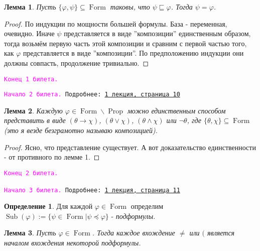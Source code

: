 \documentclass[a4paper,100pt]{article}
\theoremstyle{indented}
\newtheorem{lemma}{Лемма}
\theoremstyle{definition}
\newtheorem{defn}{Определение}
\theoremstyle{remark}
\DeclareMathOperator{\Prop}{Prop}
\DeclareMathOperator{\form}{Form}
\DeclareMathOperator{\Sub}{Sub}
\begin{document}
\begin{lemma}
  Пусть $\{\varphi , \psi\}\subseteq \form$ таковы, что $\psi \sqsubseteq \varphi$. Тогда $\psi = \varphi$. 
\end{lemma}

\begin{proof}
  По индукции по мощности большей формулы. База - переменная, очевидно. Иначе $\psi$ представляется в виде ''композиции'' единственным образом, тогда возьмём первую часть этой композиции и сравним с первой частью того, как $\varphi$ представляется в виде ''композиции''. По предположению индукции они должны совпасть, продолжение тривиально.
\end{proof}

\texttt{\textcolor{magenta}{Конец 1 билета.}} 

\hrulefill

\texttt{\hypertarget{b2}{\textcolor{magenta}{Начало 2 билета.}} Подробнее: \href{http://www.mi-ras.ru/~speranski/courses/logic-1-2021-spring/slides_1.pdf}{1 лекция, страница 10}} \\

\begin{lemma}
  Каждую $\varphi \in \form \backslash \Prop$ можно единственным способом представить в виде $(\theta \rightarrow \chi)$, $(\theta \vee \chi)$, $(\theta \wedge \chi)$ или $\neg\theta$, где $\{\theta, \chi\}\subseteq \form$ (это я везде безграмотно называю \textit{композицией}). 
\end{lemma}

\begin{proof}
  Ясно, что представление существует. А вот доказательство единственности - от противного по лемме 1.
\end{proof}

\texttt{\textcolor{magenta}{Конец 2 билета.}}

\hrulefill

\texttt{\hypertarget{b3}{\textcolor{magenta}{Начало 3 билета.}} Подробнее: \href{http://www.mi-ras.ru/~speranski/courses/logic-1-2021-spring/slides_1.pdf}{1 лекция, страница 11}} \

\begin{defn}
  Для каждой $\varphi\in \form$ определим $\Sub(\varphi):=\{\psi\in \form|\psi \preccurlyeq \varphi\}$ - \textit{подформулы}.
\end{defn}

\begin{lemma}
  Пусть $\varphi \in \form$. Тогда каждое вхождение $\neq$ или $($ является началом вхождения некоторой подформулы.
\end{lemma}
\end{document}
